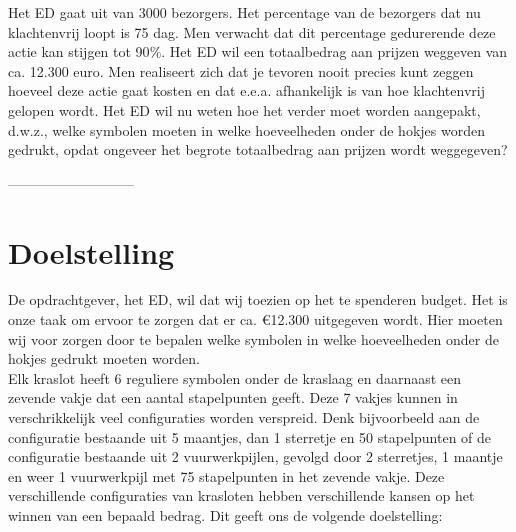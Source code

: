 Het ED gaat uit van
3000 bezorgers. Het percentage van de bezorgers dat nu klachtenvrij loopt is 75%
dag. Men verwacht dat dit percentage gedurerende deze actie kan stijgen tot 90$\%$.
Het ED wil een totaalbedrag aan prijzen weggeven van ca. 12.300 euro. Men
realiseert zich dat je tevoren nooit precies kunt zeggen hoeveel deze actie gaat kosten en
dat e.e.a. afhankelijk is van hoe klachtenvrij gelopen wordt. Het ED wil nu weten hoe
het verder moet worden aangepakt, d.w.z., welke symbolen moeten in welke hoeveelheden
onder de hokjes worden gedrukt, opdat ongeveer het begrote totaalbedrag aan prijzen
wordt weggegeven?

\begin{comment}------------------------
\begin{itemize}
  \item Uitleg over de krasloten
  \item Uitleg over de verschillende prijzen
  \item De 14 weken en wanneer er gekrast mag worden
  \item De pechprijzen
  \item Een vermelding van de kans op een klachtvrije week
\end{itemize}
\end{comment}---------------------------

\section{Doelstelling}
De opdrachtgever, het ED, wil dat wij toezien op het te spenderen budget. Het is onze taak om ervoor te zorgen dat er ca. \euro12.300 uitgegeven wordt. Hier moeten wij voor zorgen door te bepalen welke symbolen in welke hoeveelheden onder de hokjes gedrukt moeten worden.\\

Elk kraslot heeft 6 reguliere symbolen onder de kraslaag en daarnaast een zevende vakje dat een aantal stapelpunten geeft. Deze 7 vakjes kunnen in verschrikkelijk veel configuraties worden verspreid. Denk bijvoorbeeld aan de configuratie bestaande uit 5 maantjes, dan 1 sterretje en 50 stapelpunten of de configuratie bestaande uit 2 vuurwerkpijlen, gevolgd door 2 sterretjes, 1 maantje en weer 1 vuurwerkpijl met 75 stapelpunten in het zevende vakje. Deze verschillende configuraties van krasloten hebben verschillende kansen op het winnen van een bepaald bedrag. Dit geeft ons de volgende doelstelling:\\

